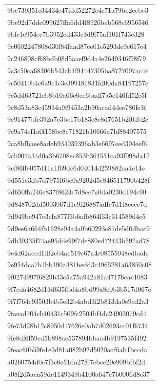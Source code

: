 \begin{tabular}{l}
9be739351c34434e47fdd52272c4c71a79be2ecbe3 \\
9be92d7dde099627ffa6dd4f8926beb568e6956546 \\
9bfc1e954ec7b3952ed433c3d9f75af101f743e328 \\
9c0602247808d30f84faad87ee01e5293de9e617c4 \\
9c246808cf68bdb08d5aaef9d4a4e2649346f98f79 \\
9c3c50ca68306b543cb1f94447305ba8727097ac4c \\
9c50410b4c6a9e1c3e399481831fd00da84197257c \\
9c5dd63721eb8b10a66e0ee6badf7a5c146fd52c5f \\
9c8d53a83c45934a9f9453a2b90acad4dee780fe3f \\
9c91477bfc392a7e3be17b183c8c8d7651b2f0db2c \\
9c9a74ef1a0f158bc8c71821b10666a7bf88407575 \\
9ca8bfbaee8adeb934039396ab3e6697eed304eef6 \\
9cb907a34d0a3b6708ec853b364551ca93f098da12 \\
9cf86ffe057d11a1f69dc6d04014d259882aa4c14e \\
9d551c3db7d7975f6be0a9202d5e846511790b428f \\
9d650ffa246c837f8624c7d8ce7a0da0230d194c90 \\
9d848702dd5003067d1e9f26887adfc7d1f8ccec7d \\
9d949be947c3cfa877f3b6afb864f33c314589d4c5 \\
9d9ee6a664fb1628e94a4a0b60293c87de5d0dbac9 \\
9db39335f74ae95dde99f7de880ed72443b592ad78 \\
9e4d62aced1df2cb4ac519c67a4c08555048edbadc \\
9e954dca7b1bb190a481bedd3c4965281a63850c08 \\
9f0274997f6829b33c5a75a942a81a47176cac1083 \\
9f7cda4682d13d635fbd4a8bd99a8e0b3b517d067c \\
9f7f764c93503b4b5e32b4abd3f2b813da0e9ed2a3 \\
9faead704cb40431c509fc2504bf4dc24903079cd4 \\
9fe73d28b12c8950d17626e0ab7d02693cc01f6734 \\
9fe8df6f59cd5b898ac537894bbaa4b9197535f492 \\
9feac60b59fe1e9d81a082b92d5020aaf6ab1bccda \\
a0260754d0e7f3c6c51da27f07ebce20e909bfbf2d \\
a08f2d5aea59dc1149349b4100a647e7b0006d8c37 \\

\end{tabular}

